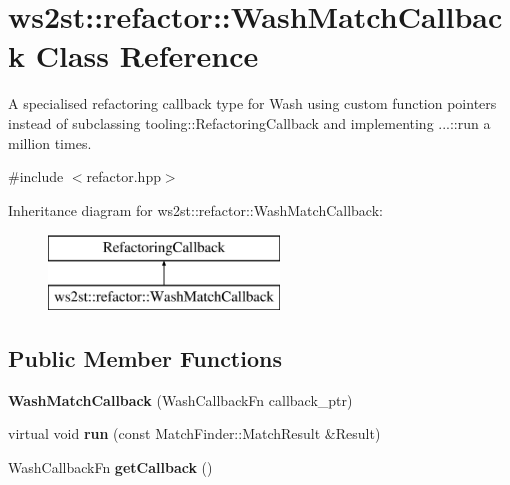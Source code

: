 \hypertarget{classws2st_1_1refactor_1_1WashMatchCallback}{}\section{ws2st\+:\+:refactor\+:\+:Wash\+Match\+Callback Class Reference}
\label{classws2st_1_1refactor_1_1WashMatchCallback}


A specialised refactoring callback type for Wash using custom function pointers instead of subclassing tooling\+::\+Refactoring\+Callback and implementing ...\+::run a million times.  




{\ttfamily \#include $<$refactor.\+hpp$>$}

Inheritance diagram for ws2st\+:\+:refactor\+:\+:Wash\+Match\+Callback\+:\begin{figure}[H]
\begin{center}
\leavevmode
\includegraphics[height=2.000000cm]{classws2st_1_1refactor_1_1WashMatchCallback}
\end{center}
\end{figure}
\subsection*{Public Member Functions}
\begin{DoxyCompactItemize}
\item 
\mbox{\label{classws2st_1_1refactor_1_1WashMatchCallback_a92cc5cf8562d6d0df12547a5df116bec}} 
{\bfseries Wash\+Match\+Callback} (Wash\+Callback\+Fn callback\+\_\+ptr)
\item 
\mbox{\label{classws2st_1_1refactor_1_1WashMatchCallback_a1712bb28c2728b43b5ca0f2d682382a6}} 
virtual void {\bfseries run} (const Match\+Finder\+::\+Match\+Result \&Result)
\item 
\mbox{\label{classws2st_1_1refactor_1_1WashMatchCallback_a91f255d66c7a62daa588b7f6910b5b50}} 
Wash\+Callback\+Fn {\bfseries get\+Callback} ()
\end{DoxyCompactItemize}
